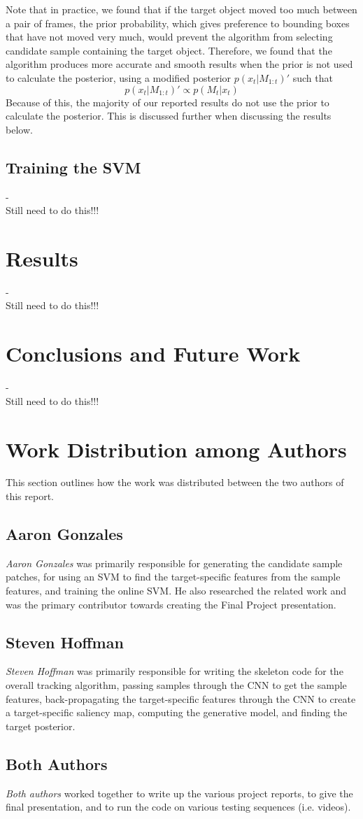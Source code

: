 \documentclass{sig-alternate-05-2015}
\newcommand{\todo}{{\\ \huge \color{red} Still need to do this!!!}} %
\begin{document}
Note that in practice, we found that if the target object moved too much between a pair of frames, the prior probability, which gives preference to bounding boxes that have not moved very much, would prevent the algorithm from selecting candidate sample containing the target object.
Therefore, we found that the algorithm produces more accurate and smooth results when the prior is not used to calculate the posterior, using a modified posterior $p(x_t|M_{1:t})'$ such that
\begin{equation}
\label{eq:posterior-mod}
p(x_t|M_{1:t})' \propto p(M_t |x_t)
\end{equation}
Because of this, the majority of our reported results do not use the prior to calculate the posterior.
This is discussed further when discussing the results below.

\subsection{Training the SVM}
\label{sec:training-svm} %
-
\todo

\section{Results}
-
\todo

\section{Conclusions and Future Work}
-
\todo


\section{Work Distribution among Authors}
This section outlines how the work was distributed between the two authors of this report. 

\subsection{Aaron Gonzales}
\textit{Aaron Gonzales} was primarily responsible for generating the candidate sample patches, for using an SVM to find the target-specific features from the sample features, and training the online SVM.
He also researched the related work and was the primary contributor towards creating the Final Project presentation.

\subsection{Steven Hoffman}
\textit{Steven Hoffman} was primarily responsible for writing the skeleton code for the overall tracking algorithm, passing samples through the CNN to get the sample features, back-propagating the target-specific features through the CNN to create a target-specific saliency map, computing the generative model, and finding the target posterior.

\subsection{Both Authors}
\textit{Both authors} worked together to write up the various project reports, to give the final presentation, and to run the code on various testing sequences (i.e. videos).



\end{document}
